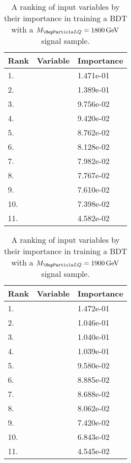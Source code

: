 \begin{table}[H]
	\caption{A ranking of input variables by their importance in training a BDT with a $\MLQ = \SI{1800}{GeV}$ signal sample.}
	\begin{center}
		\begin{tabular}{lll} \hline \hline
			Rank & Variable & Importance  \\ \hline
			1. & \MujTwo & 1.471e-01 \\
			2. & \ST & 1.389e-01 \\
			3. & \MujOne & 9.756e-02 \\
			4. & \Muujj & 9.420e-02 \\
			5. & \ptof{\PjTwo} & 8.762e-02 \\
			6. & \ptof{\PmuTwo} & 8.128e-02 \\
			7. & \ptof{\PmuOne} & 7.982e-02 \\
			8. & \DRof{\PmuOne+\PmuTwo}{\PjOne} & 7.767e-02 \\
			9. & \ptof{\PjOne} & 7.610e-02 \\
			10. & \Muu & 7.398e-02 \\
			11. & \MET & 4.582e-02 \\ \hline \hline
		\end{tabular}
		\label{tab:bdtRank1800}
	\end{center}
\end{table}

\begin{table}[H]
	\caption{A ranking of input variables by their importance in training a BDT with a $\MLQ = \SI{1900}{GeV}$ signal sample.}
	\begin{center}
		\begin{tabular}{lll} \hline \hline
			Rank & Variable & Importance  \\ \hline
			1. & \MujTwo & 1.472e-01 \\
			2. & \ST & 1.046e-01 \\
			3. & \MujOne & 1.040e-01 \\
			4. & \Muujj & 1.039e-01 \\
			5. & \ptof{\PjTwo} & 9.580e-02 \\
			6. & \DRof{\PmuOne+\PmuTwo}{\PjOne} & 8.885e-02 \\
			7. & \ptof{\PmuTwo} & 8.688e-02 \\
			8. & \Muu & 8.062e-02 \\
			9. & \ptof{\PjOne} & 7.420e-02 \\
			10. & \ptof{\PmuOne} & 6.843e-02 \\
			11. & \MET & 4.545e-02 \\ \hline \hline
		\end{tabular}
		\label{tab:bdtRank1900}
	\end{center}
\end{table}

